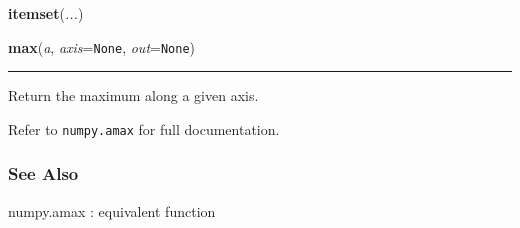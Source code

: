     \label{numpy:ndarray:itemset}

    \vspace{0.5ex}

    \begin{boxedminipage}{\textwidth}

    \raggedright \textbf{itemset}(\textit{...})

    \end{boxedminipage}

    \label{numpy:ndarray:max}

    \vspace{0.5ex}

    \begin{boxedminipage}{\textwidth}

    \raggedright \textbf{max}(\textit{a}, \textit{axis}=\texttt{None}, \textit{out}=\texttt{None})

    \vspace{-1.5ex}

    \rule{\textwidth}{0.5\fboxrule}

Return the maximum along a given axis.

Refer to \texttt{numpy.amax} for full documentation.



\hypertarget{see-also}{}
\subsubsection*{See Also}

numpy.amax : equivalent function
    \vspace{1ex}

    \end{boxedminipage}

    \label{numpy:ndarray:mean}

    \vspace{0.5ex}

